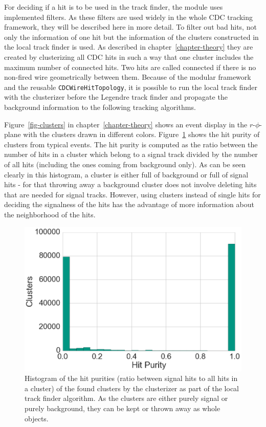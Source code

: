 For deciding if a hit is to be used in the track finder, the module uses implemented filters. As these filters are used widely in the whole CDC tracking framework, they will be described here in more detail. To filter out bad hits, not only the information of one hit but the information of the clusters constructed in the local track finder is used. As described in chapter~\ref{chapter-theory} they are created by clusterizing all CDC hits in such a way that one cluster includes the maximum number of connected hits. Two hits are called connected if there is no non-fired wire geometrically between them. Because of the modular framework and the reusable \texttt{CDCWireHitTopology}, it is possible to run the local track finder with the clusterizer before the Legendre track finder and propagate the background information to the following tracking algorithms. 

Figure~\ref{fig-clusters} in chapter~\ref{chapter-theory} shows an event display in the $r$-$\phi$-plane with the clusters drawn in different colors. Figure~\ref{fig-cluster-hit-purity} shows the hit purity of clusters from typical events. The hit purity is computed as the ratio between the number of hits in a cluster which belong to a signal track divided by the number of all hits (including the ones coming from background only). As can be seen clearly in this histogram, a cluster is either full of background or full of signal hits - for that throwing away a background cluster does not involve deleting hits that are needed for signal tracks. However, using clusters instead of single hits for deciding the signalness of the hits has the advantage of more information about the neighborhood of the hits.

\begin{figure}
  \centering
  \includegraphics[width=0.7\linewidth]{figures/workflow/cluster_purity.png}
  \caption{Histogram of the hit purities (ratio between signal hits to all hits in a cluster) of the found clusters by the clusterizer as part of the local track finder algorithm. As the clusters are either purely signal or purely background, they can be kept or thrown away as whole objects.}
  \label{fig-cluster-hit-purity}
\end{figure}

